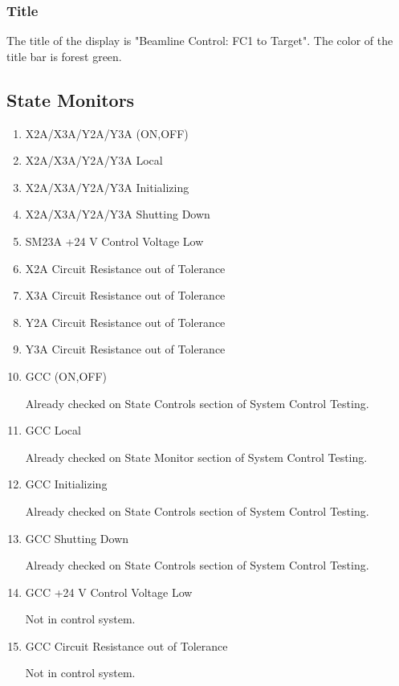 \documentclass[11pt]{book}		%
\begin{document}
\subsubsection{Title}\label{sect:cyc-op-interface-status-terminal-display-contents-beamline-target-title}

The title of the display is "Beamline Control: FC1 to Target".  The color of the title bar is forest green.

\subsection{State Monitors}

\begin{enumerate}
 \item X2A/X3A/Y2A/Y3A (ON,OFF)
 \item X2A/X3A/Y2A/Y3A Local
 \item X2A/X3A/Y2A/Y3A Initializing
 \item X2A/X3A/Y2A/Y3A Shutting Down
 \item SM23A +24 V Control Voltage Low
 \item X2A Circuit Resistance out of Tolerance
 \item X3A Circuit Resistance out of Tolerance
 \item Y2A Circuit Resistance out of Tolerance
 \item Y3A Circuit Resistance out of Tolerance
 \item GCC (ON,OFF)

\color{red}
Already checked on State Controls section of System Control Testing.
\color{black}

 \item GCC Local

\color{red}
Already checked on State Monitor section of System Control Testing.
\color{black}

 \item GCC Initializing

\color{red}
Already checked on State Controls section of System Control Testing.
\color{black}

 \item GCC Shutting Down

\color{red}
Already checked on State Controls section of System Control Testing.
\color{black}

 \item GCC +24 V Control Voltage Low

\color{red}
Not in control system.
\color{black}

 \item GCC Circuit Resistance out of Tolerance

\color{red}
Not in control system.
\color{black}

\end{enumerate}
\end{document}
